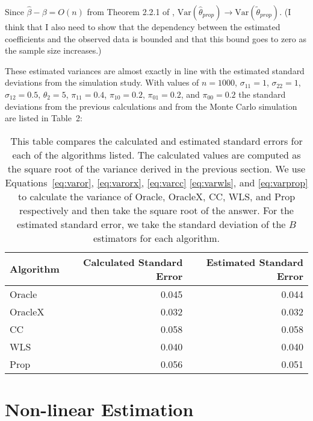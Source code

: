 \documentclass[12pt]{article}
\newcommand{\Var}{{\text{Var}}}
\begin{document}
Since $\hat \beta - \beta = O(n)$ from Theorem 2.2.1 of \cite{fuller2009sampling}, 
$\Var(\hat \theta_{prop}) \to \Var(\tilde \theta_{prop})$. (I think that 
I also need to show that the dependency between the estimated 
coefficients and the observed data is bounded and that this bound goes 
to zero as the sample size increases.)

These estimated variances are almost exactly in line with the estimated
standard deviations from the simulation study. With values of $n = 1000$,
$\sigma_{11} = 1$, $\sigma_{22} = 1$, $\sigma_{12} = 0.5$, $\theta_2 = 5$,
$\pi_{11} = 0.4$, $\pi_{10} = 0.2$, $\pi_{01} = 0.2$, and $\pi_{00} = 0.2$
the standard deviations from the previous calculations and from the Monte Carlo
simulation are listed in Table~2:

\begin{table}[!ht]
  \centering
  \label{tab:calmc}
  \caption{This table compares the calculated and estimated standard 
  errors for each of the algorithms listed. The calculated values are 
  computed as the square root of the variance derived in the previous 
  section. We use Equations~\ref{eq:varor}, \ref{eq:varorx}, \ref{eq:varcc}
  \ref{eq:varwls}, and \ref{eq:varprop} to calculate the variance of 
  Oracle, OracleX, CC, WLS, and Prop respectively and then take the square
  root of the answer. For the estimated standard error, we take the 
  standard deviation of the $B$ estimators for each algorithm.}
  \begin{tabular}{lrr}
    \toprule
    Algorithm & Calculated Standard Error & Estimated Standard Error \\
    \midrule
    Oracle  & 0.045 & 0.044 \\
    OracleX & 0.032 & 0.032 \\
    CC      & 0.058 & 0.058 \\
    WLS     & 0.040 & 0.040 \\
    Prop    & 0.056 & 0.051 \\
    \bottomrule
  \end{tabular}
\end{table}

\newpage
  \quad
\newpage

\section*{Non-linear Estimation}
\end{document}
